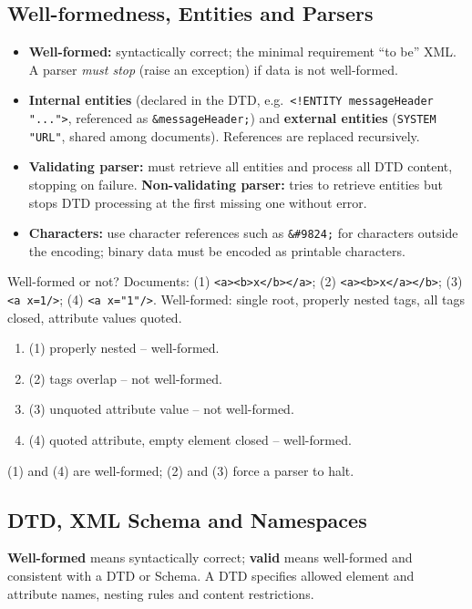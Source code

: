 \subsection{Well-formedness, Entities and Parsers}
\begin{itemize}[leftmargin=*]
  \item \textbf{Well-formed:} syntactically correct; the minimal requirement ``to be'' XML. A parser \emph{must stop}
        (raise an exception) if data is not well-formed.
  \item \textbf{Internal entities} (declared in the DTD, e.g.\ \verb|<!ENTITY messageHeader "...">|, referenced as
        \verb|&messageHeader;|) and \textbf{external entities} (\verb|SYSTEM "URL"|, shared among documents).
        References are replaced recursively.
  \item \textbf{Validating parser:} must retrieve all entities and process all DTD content, stopping on failure.
        \textbf{Non-validating parser:} tries to retrieve entities but stops DTD processing at the first missing
        one without error.
  \item \textbf{Characters:} use character references such as \verb|&#9824;| for characters outside the encoding;
        binary data must be encoded as printable characters.
\end{itemize}

\begin{solved}{Well-formed or not?}
\Given Documents: (1) \verb|<a><b>x</b></a>|; (2) \verb|<a><b>x</a></b>|; (3) \verb|<a x=1/>|; (4) \verb|<a x="1"/>|.
\Formula Well-formed: single root, properly nested tags, all tags closed, attribute values quoted.
\Steps
\begin{enumerate}[leftmargin=*]
  \item (1) properly nested -- well-formed.
  \item (2) tags overlap -- not well-formed.
  \item (3) unquoted attribute value -- not well-formed.
  \item (4) quoted attribute, empty element closed -- well-formed.
\end{enumerate}
\Answer (1) and (4) are well-formed; (2) and (3) force a parser to halt.
\end{solved}

\subsection{DTD, XML Schema and Namespaces}
\textbf{Well-formed} means syntactically correct; \textbf{valid} means well-formed and consistent with a DTD or Schema.
A DTD specifies allowed element and attribute names, nesting rules and content restrictions.

